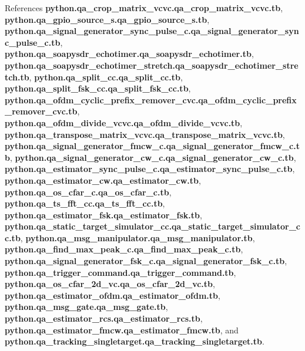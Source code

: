 References {\bf python.\+qa\+\_\+crop\+\_\+matrix\+\_\+vcvc.\+qa\+\_\+crop\+\_\+matrix\+\_\+vcvc.\+tb}, {\bf python.\+qa\+\_\+gpio\+\_\+source\+\_\+s.\+qa\+\_\+gpio\+\_\+source\+\_\+s.\+tb}, {\bf python.\+qa\+\_\+signal\+\_\+generator\+\_\+sync\+\_\+pulse\+\_\+c.\+qa\+\_\+signal\+\_\+generator\+\_\+sync\+\_\+pulse\+\_\+c.\+tb}, {\bf python.\+qa\+\_\+soapysdr\+\_\+echotimer.\+qa\+\_\+soapysdr\+\_\+echotimer.\+tb}, {\bf python.\+qa\+\_\+soapysdr\+\_\+echotimer\+\_\+stretch.\+qa\+\_\+soapysdr\+\_\+echotimer\+\_\+stretch.\+tb}, {\bf python.\+qa\+\_\+split\+\_\+cc.\+qa\+\_\+split\+\_\+cc.\+tb}, {\bf python.\+qa\+\_\+split\+\_\+fsk\+\_\+cc.\+qa\+\_\+split\+\_\+fsk\+\_\+cc.\+tb}, {\bf python.\+qa\+\_\+ofdm\+\_\+cyclic\+\_\+prefix\+\_\+remover\+\_\+cvc.\+qa\+\_\+ofdm\+\_\+cyclic\+\_\+prefix\+\_\+remover\+\_\+cvc.\+tb}, {\bf python.\+qa\+\_\+ofdm\+\_\+divide\+\_\+vcvc.\+qa\+\_\+ofdm\+\_\+divide\+\_\+vcvc.\+tb}, {\bf python.\+qa\+\_\+transpose\+\_\+matrix\+\_\+vcvc.\+qa\+\_\+transpose\+\_\+matrix\+\_\+vcvc.\+tb}, {\bf python.\+qa\+\_\+signal\+\_\+generator\+\_\+fmcw\+\_\+c.\+qa\+\_\+signal\+\_\+generator\+\_\+fmcw\+\_\+c.\+tb}, {\bf python.\+qa\+\_\+signal\+\_\+generator\+\_\+cw\+\_\+c.\+qa\+\_\+signal\+\_\+generator\+\_\+cw\+\_\+c.\+tb}, {\bf python.\+qa\+\_\+estimator\+\_\+sync\+\_\+pulse\+\_\+c.\+qa\+\_\+estimator\+\_\+sync\+\_\+pulse\+\_\+c.\+tb}, {\bf python.\+qa\+\_\+estimator\+\_\+cw.\+qa\+\_\+estimator\+\_\+cw.\+tb}, {\bf python.\+qa\+\_\+os\+\_\+cfar\+\_\+c.\+qa\+\_\+os\+\_\+cfar\+\_\+c.\+tb}, {\bf python.\+qa\+\_\+ts\+\_\+fft\+\_\+cc.\+qa\+\_\+ts\+\_\+fft\+\_\+cc.\+tb}, {\bf python.\+qa\+\_\+estimator\+\_\+fsk.\+qa\+\_\+estimator\+\_\+fsk.\+tb}, {\bf python.\+qa\+\_\+static\+\_\+target\+\_\+simulator\+\_\+cc.\+qa\+\_\+static\+\_\+target\+\_\+simulator\+\_\+cc.\+tb}, {\bf python.\+qa\+\_\+msg\+\_\+manipulator.\+qa\+\_\+msg\+\_\+manipulator.\+tb}, {\bf python.\+qa\+\_\+find\+\_\+max\+\_\+peak\+\_\+c.\+qa\+\_\+find\+\_\+max\+\_\+peak\+\_\+c.\+tb}, {\bf python.\+qa\+\_\+signal\+\_\+generator\+\_\+fsk\+\_\+c.\+qa\+\_\+signal\+\_\+generator\+\_\+fsk\+\_\+c.\+tb}, {\bf python.\+qa\+\_\+trigger\+\_\+command.\+qa\+\_\+trigger\+\_\+command.\+tb}, {\bf python.\+qa\+\_\+os\+\_\+cfar\+\_\+2d\+\_\+vc.\+qa\+\_\+os\+\_\+cfar\+\_\+2d\+\_\+vc.\+tb}, {\bf python.\+qa\+\_\+estimator\+\_\+ofdm.\+qa\+\_\+estimator\+\_\+ofdm.\+tb}, {\bf python.\+qa\+\_\+msg\+\_\+gate.\+qa\+\_\+msg\+\_\+gate.\+tb}, {\bf python.\+qa\+\_\+estimator\+\_\+rcs.\+qa\+\_\+estimator\+\_\+rcs.\+tb}, {\bf python.\+qa\+\_\+estimator\+\_\+fmcw.\+qa\+\_\+estimator\+\_\+fmcw.\+tb}, and {\bf python.\+qa\+\_\+tracking\+\_\+singletarget.\+qa\+\_\+tracking\+\_\+singletarget.\+tb}.

